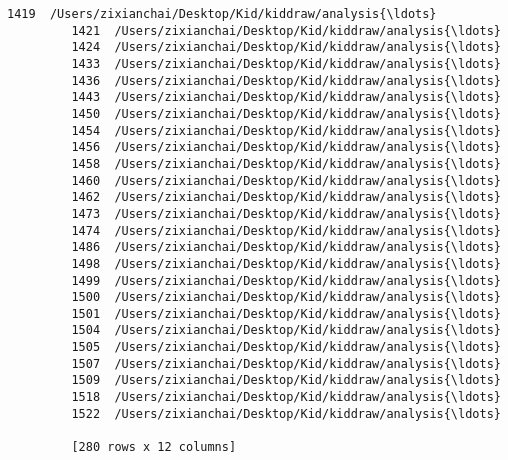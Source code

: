 \documentclass[11pt]{article}
\begin{document}
\begin{Verbatim}[commandchars=\\\{\}]
         1419  /Users/zixianchai/Desktop/Kid/kiddraw/analysis{\ldots}  
         1421  /Users/zixianchai/Desktop/Kid/kiddraw/analysis{\ldots}  
         1424  /Users/zixianchai/Desktop/Kid/kiddraw/analysis{\ldots}  
         1433  /Users/zixianchai/Desktop/Kid/kiddraw/analysis{\ldots}  
         1436  /Users/zixianchai/Desktop/Kid/kiddraw/analysis{\ldots}  
         1443  /Users/zixianchai/Desktop/Kid/kiddraw/analysis{\ldots}  
         1450  /Users/zixianchai/Desktop/Kid/kiddraw/analysis{\ldots}  
         1454  /Users/zixianchai/Desktop/Kid/kiddraw/analysis{\ldots}  
         1456  /Users/zixianchai/Desktop/Kid/kiddraw/analysis{\ldots}  
         1458  /Users/zixianchai/Desktop/Kid/kiddraw/analysis{\ldots}  
         1460  /Users/zixianchai/Desktop/Kid/kiddraw/analysis{\ldots}  
         1462  /Users/zixianchai/Desktop/Kid/kiddraw/analysis{\ldots}  
         1473  /Users/zixianchai/Desktop/Kid/kiddraw/analysis{\ldots}  
         1474  /Users/zixianchai/Desktop/Kid/kiddraw/analysis{\ldots}  
         1486  /Users/zixianchai/Desktop/Kid/kiddraw/analysis{\ldots}  
         1498  /Users/zixianchai/Desktop/Kid/kiddraw/analysis{\ldots}  
         1499  /Users/zixianchai/Desktop/Kid/kiddraw/analysis{\ldots}  
         1500  /Users/zixianchai/Desktop/Kid/kiddraw/analysis{\ldots}  
         1501  /Users/zixianchai/Desktop/Kid/kiddraw/analysis{\ldots}  
         1504  /Users/zixianchai/Desktop/Kid/kiddraw/analysis{\ldots}  
         1505  /Users/zixianchai/Desktop/Kid/kiddraw/analysis{\ldots}  
         1507  /Users/zixianchai/Desktop/Kid/kiddraw/analysis{\ldots}  
         1509  /Users/zixianchai/Desktop/Kid/kiddraw/analysis{\ldots}  
         1518  /Users/zixianchai/Desktop/Kid/kiddraw/analysis{\ldots}  
         1522  /Users/zixianchai/Desktop/Kid/kiddraw/analysis{\ldots}  
         
         [280 rows x 12 columns]
\end{Verbatim}
            
\end{document}
